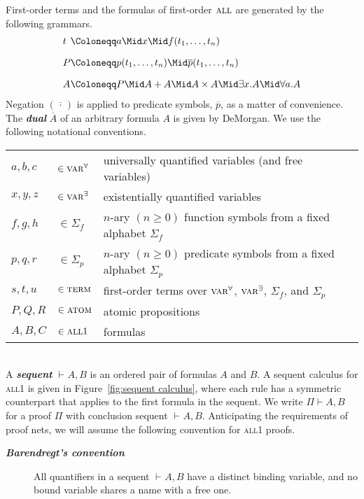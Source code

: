 \documentclass{article}
\theoremstyle{definition}
\theoremstyle{plain}
\newcommand\defn[1]{\textit{\textbf{#1}}}
\newcommand\varA{\textsc{var}^\forall}
\newcommand\varE{\textsc{var}^\exists}
\newcommand\terms{\textsc{term}}
\newcommand\termsA{\textsc{term}^\forall}
\newcommand\atom{\textsc{atom}}
\newcommand\all{\textsc{all}}
\newcommand\+{+}
\renewcommand\*{\times}
\newcommand\dual[1]{\overline{#1}}
\newcommand\seq[3][]{{\vdash_{#1}}#2,#3}
\newcommand\prf[3]{#1\vdash\!#2,#3}
\begin{document}
First-order terms and the formulas of first-order $\all$ are generated by the following grammars.
%
\setMidspace{5pt}
\[
\begin{array}{l@{}l}
	t &\Coloneqq a \Mid x \Mid f(t_1,\dots,t_n)
\\[10pt]
	P &\Coloneqq p(t_1,\dots,t_n) \Mid \dual p(t_1,\dots,t_n)
\\[10pt]
	A &\Coloneqq P \Mid A\+A \Mid A\*A \Mid \exists x.A \Mid \forall a.A
\end{array}
\]
%
Negation $(\dual{\,\cdot\,})$ is applied to predicate symbols, $\dual p$, as a matter of convenience. The \defn{dual} $\dual A$ of an arbitrary formula $A$ is given by DeMorgan. We use the following notational conventions.
%
\\[2\itemsep]
%
\begin{tabular}{@{}lll@{}}
	$a,b,c$ & $\in \varA$ 		& universally quantified variables (and free variables)\\
	$x,y,z$ & $\in \varE$		& existentially quantified variables \\
	$f,g,h$ & $\in \Sigma_f$	& $n$-ary $(n\geq 0)$ function symbols from a fixed alphabet $\Sigma_f$\\
	$p,q,r$ & $\in \Sigma_p$	& $n$-ary $(n\geq 0)$ predicate symbols from a fixed alphabet $\Sigma_p$ \\
	$s,t,u$ & $\in \terms$ 		& first-order terms over $\varA$, $\varE$, $\Sigma_f$, and $\Sigma_p$ \\
	$P,Q,R$ & $\in \atom$		& atomic propositions \\
	$A,B,C$ & $\in \all1$		& formulas \\
\end{tabular}
%
\\[2\itemsep]
%
A \defn{sequent} $\seq AB$ is an ordered pair of formulas $A$ and $B$. A sequent calculus for \all1 is given in Figure~\ref{fig:sequent calculus}, where each rule has a symmetric counterpart that applies to the first formula in the sequent. We write $\prf\Pi AB$ for a proof $\Pi$ with conclusion sequent $\seq AB$. Anticipating the requirements of proof nets, we will assume the following convention for \all1 proofs.

\begin{description}
	\item
[\defn{Barendregt's convention}] All quantifiers in a sequent $\seq AB$ have a distinct binding variable, and no bound variable shares a name with a free one.
\end{description}
\end{document}
